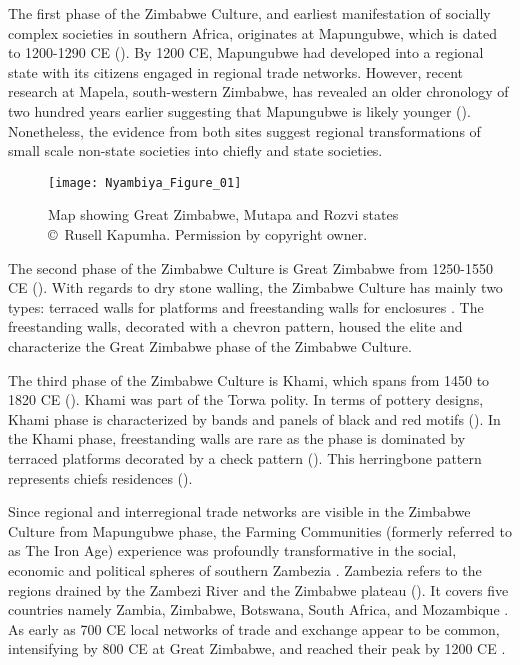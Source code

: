 The first phase of the Zimbabwe Culture, and earliest manifestation of socially complex societies in southern Africa, originates at Mapungubwe, which is dated to 1200-1290 CE (\cites{pwiti2005}{pikirayi2006}{kim2008}{chirikure2014}{huffman2015}). By 1200 CE, Mapungubwe had developed into a  regional state with its citizens engaged in regional trade networks.  However, recent research at Mapela, south-western Zimbabwe, has revealed an older chronology of two hundred years earlier suggesting that Mapungubwe is likely younger (\cites{chirikure2013socio}{chirikure2014}).
 Nonetheless, the evidence from both sites suggest  regional transformations of small scale non-state societies into chiefly and state societies.

\begin{figure}[!tb]
	\texttt{[image: Nyambiya\_Figure\_01]}
	\caption{Map showing Great Zimbabwe, Mutapa and Rozvi states
		{\normalfont\scriptsize \\ \copyright\ Rusell Kapumha. Permission by copyright owner.
	}
}
	\label{fig:Nyambiya_Figure_01}
\end{figure}

The second phase of the Zimbabwe Culture is Great Zimbabwe from 1250-1550 CE (\cites{pikirayi2006}{kim2008}). With regards to dry stone walling, the Zimbabwe Culture has mainly two types: terraced walls for platforms and freestanding walls for enclosures \parencite{chirikure2013socio}. The freestanding walls, decorated with a chevron pattern, housed the elite and characterize the Great Zimbabwe phase of the Zimbabwe Culture.

The third phase of the Zimbabwe Culture is Khami, which spans from 1450 to 1820 CE (\cites{manyanga2006}{chirikure2014}).  Khami was  part of the Torwa polity. In terms of pottery designs, Khami phase is characterized by bands and panels of black and red motifs (\cites{huffman2011}{chirikure2013socio}). In the Khami phase, freestanding walls are rare as the phase is dominated by terraced platforms decorated by a check pattern (\cites{huffman2011}{huffman2012}{chirikure2013socio}). This herringbone pattern represents chiefs residences (\cites{pikirayi2007}{huffman2011}).

Since regional and interregional trade networks are visible in the Zimbabwe Culture from Mapungubwe phase, the Farming Communities (formerly referred to as The Iron Age) experience was  profoundly transformative in the social, economic and political spheres of southern Zambezia \parencite{pikirayi2007}.
Zambezia refers to the regions drained by the Zambezi River and the Zimbabwe plateau (\cite[][3]{pikirayi2001}). It covers five countries namely Zambia, Zimbabwe, Botswana, South Africa, and Mozambique \parencite{kim2008}.
As early as 700 CE local networks of trade and exchange appear to be common, intensifying by 800 CE at Great Zimbabwe, and  reached their peak by 1200 CE \parencites{kusimba1999}{kim2008}.

